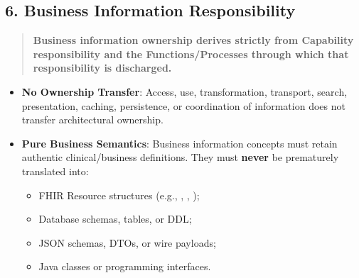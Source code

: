 \par\smallskip
{}\label{rad:metamodel:257}
\subsection*{6. Business Information Responsibility}
\label{rad:metamodel:259}

\begin{quote}

\textbf{Business information ownership derives strictly from Capability responsibility and the Functions/\allowbreak{}Processes through which that responsibility is discharged.}


\end{quote}
\label{rad:metamodel:261}

\begin{itemize}

\item 
\textbf{No Ownership Transfer}: Access, use, transformation, transport, search, presentation, caching, persistence, or coordination of information does not transfer architectural ownership.



\item 
\textbf{Pure Business Semantics}: Business information concepts must retain authentic clinical/\allowbreak{}business definitions. They must \textbf{never} be prematurely translated into:


\begin{itemize}

\item 
FHIR Resource structures (e.g., \texttt{}, \texttt{}, \texttt{});



\item 
Database schemas, tables, or DDL;



\item 
JSON schemas, DTOs, or wire payloads;



\item 
Java classes or programming interfaces.



\end{itemize}


\end{itemize}
\label{rad:metamodel:268}

